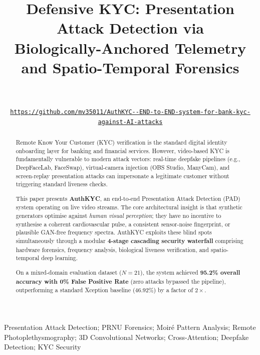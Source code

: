 \documentclass[10pt,twocolumn]{IEEEtran}
\begin{document}
\title{Defensive KYC: Presentation Attack Detection via\\
       Biologically-Anchored Telemetry and Spatio-Temporal Forensics}

\author{%
  \\[2pt]
  \\[6pt]
  \small\texttt{\url{https://github.com/mv35011/AuthKYC--END-to-END-system-for-bank-kyc-against-AI-attacks}}
}

\maketitle

\begin{abstract}
Remote Know Your Customer (KYC) verification is the standard digital identity onboarding layer for banking and financial services. However, video-based KYC is fundamentally vulnerable to modern attack vectors: real-time deepfake pipelines (e.g., DeepFaceLab, FaceSwap), virtual-camera injection (OBS Studio, ManyCam), and screen-replay presentation attacks can impersonate a legitimate customer without triggering standard liveness checks.

This paper presents \textbf{AuthKYC}, an end-to-end Presentation Attack Detection (PAD) system operating on live video streams. The core architectural insight is that synthetic generators optimise against \emph{human visual perception}; they have no incentive to synthesise a coherent cardiovascular pulse, a consistent sensor-noise fingerprint, or plausible GAN-free frequency spectra. AuthKYC exploits these blind spots simultaneously through a modular \textbf{4-stage cascading security waterfall} comprising hardware forensics, frequency analysis, biological liveness verification, and spatio-temporal deep learning.

On a mixed-domain evaluation dataset ($N=21$), the system achieved \textbf{95.2\% overall accuracy with 0\% False Positive Rate} (zero attacks bypassed the pipeline), outperforming a standard Xception baseline (46.92\%) by a factor of $2\times$.
\end{abstract}

\begin{IEEEkeywords}
Presentation Attack Detection; PRNU Forensics; Moiré Pattern Analysis; Remote Photoplethysmography; 3D Convolutional Networks; Cross-Attention; Deepfake Detection; KYC Security
\end{IEEEkeywords}
\end{document}
